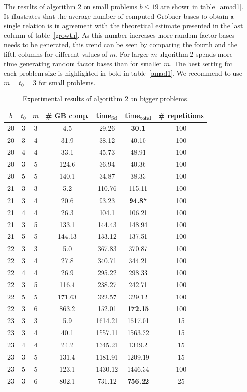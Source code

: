 \documentclass[thesis=M,english]{FITthesis}[2012/10/20]
\theoremstyle{remark}
\theoremstyle{definition}
\begin{document}
\noindent The results of algorithm 2 on small problems $b \leq 19$ are shown in table~\ref{amad1}. It illustrates that the average number of computed Gröbner bases to obtain a single relation is in agreement with the theoretical estimate presented in the last column of table~\ref{growth}. As this number increases more random factor bases needs to be generated, this trend can be seen by comparing the fourth and the fifth columns for different values of $m$.  For larger $m$ algorithm 2 spends more time generating random factor bases than for smaller $m$. The best setting for each problem size is highlighted in bold in table~\ref{amad1}. We recommend to use $m=t_0=3$ for small problems.
\begin{table}[H]
\centering
\begin{tabular}{ |c||c|c|c|c|c|c| } 
 \hline
$b$ & $t_0$ & $m$ & \# GB comp. & time$_\text{Sol}$ & \textbf{time}$_\textbf{total}$ & \# repetitions \\
 \hline
 \hline
20 & 3 & 3 & 4.5 & 29.26 & \textbf{30.1}& 100 \\ \hline
20 & 3 & 4 & 31.9 & 38.12 & 40.10 & 100 \\ \hline 
20 & 4 & 4 & 33.1 & 45.73 & 48.91 & 100 \\ \hline 
20 & 3 & 5& 124.6 & 36.94 & 40.36 & 100 \\ \hline 
20 & 5 & 5 & 140.1 & 34.87 & 38.33 & 100 \\ \hline \hline
21 & 3 & 3 & 5.2 & 110.76 & 115.11 & 100 \\ \hline
21 & 3 & 4 & 20.6 & 93.23 & \textbf{94.87} & 100 \\ \hline
21 & 4 & 4 & 26.3 & 104.1 & 106.21 & 100 \\ \hline
21 & 3 & 5& 133.1 & 144.43 & 148.94 & 100 \\ \hline 
21 & 5 & 5 & 144.13 & 133.12 & 137.51 & 100 \\ \hline \hline
22 & 3 & 3 & 5.0 & 367.83 & 370.87 & 100 \\ \hline
22 & 3 & 4 & 27.8 & 340.71 & 344.21 & 100 \\ \hline
22 & 4 & 4 & 26.9 & 295.22 & 298.33 & 100 \\ \hline 
22 & 3 & 5& 116.4 & 238.27 & 242.71 & 100 \\ \hline 
22 & 5 & 5 & 171.63 & 322.57 & 329.12 & 100 \\ \hline 
22 & 3 & 6 & 863.2 & 152.01 & \textbf{172.15} & 100 \\ \hline \hline
23 & 3 & 3 & 5.9 & 1614.21 & 1617.01 & 15 \\ \hline
23 & 3 & 4 & 40.1 & 1557.11 & 1563.32 & 15 \\ \hline
23 & 4 & 4 & 24.2 & 1345.21 & 1349.2 & 15 \\ \hline 
23 & 3 & 5& 131.4 & 1181.91 & 1209.19 & 15 \\ \hline 
23 & 5 & 5 & 123.1 & 1430.12 & 1446.34 & 100 \\ \hline 
23 & 3 & 6 & 802.1 & 731.12 & \textbf{756.22} & 25 \\ \hline 
\end{tabular}
\caption[Experimental results of algorithm 2 on bigger problems]{Experimental results of algorithm 2 on bigger problems.}
\label{amad2}
\end{table}
\end{document}
